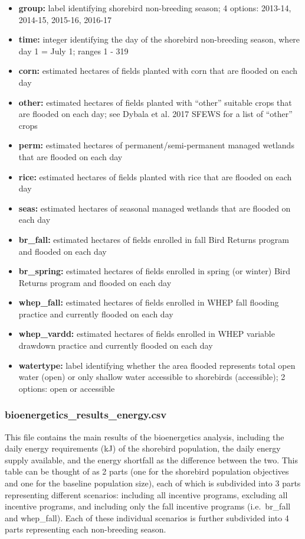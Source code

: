 \documentclass[]{article}
\providecommand{\tightlist}{%
  \setlength{\itemsep}{0pt}\setlength{\parskip}{0pt}}
\begin{document}
\begin{itemize}
\tightlist
\item
  \textbf{group:} label identifying shorebird non-breeding season; 4
  options: 2013-14, 2014-15, 2015-16, 2016-17
\item
  \textbf{time:} integer identifying the day of the shorebird
  non-breeding season, where day 1 = July 1; ranges 1 - 319
\item
  \textbf{corn:} estimated hectares of fields planted with corn that are
  flooded on each day
\item
  \textbf{other:} estimated hectares of fields planted with ``other''
  suitable crops that are flooded on each day; see Dybala et al. 2017
  SFEWS for a list of ``other'' crops
\item
  \textbf{perm:} estimated hectares of permanent/semi-permanent managed
  wetlands that are flooded on each day
\item
  \textbf{rice:} estimated hectares of fields planted with rice that are
  flooded on each day
\item
  \textbf{seas:} estimated hectares of seasonal managed wetlands that
  are flooded on each day
\item
  \textbf{br\_fall:} estimated hectares of fields enrolled in fall Bird
  Returns program and flooded on each day
\item
  \textbf{br\_spring:} estimated hectares of fields enrolled in spring
  (or winter) Bird Returns program and flooded on each day
\item
  \textbf{whep\_fall:} estimated hectares of fields enrolled in WHEP
  fall flooding practice and currently flooded on each day
\item
  \textbf{whep\_vardd:} estimated hectares of fields enrolled in WHEP
  variable drawdown practice and currently flooded on each day
\item
  \textbf{watertype:} label identifying whether the area flooded
  represents total open water (open) or only shallow water accessible to
  shorebirds (accessible); 2 options: open or accessible
\end{itemize}

\subsubsection{bioenergetics\_results\_energy.csv}\label{bioenergetics_results_energy.csv}

This file contains the main results of the bioenergetics analysis,
including the daily energy requirements (kJ) of the shorebird
population, the daily energy supply available, and the energy shortfall
as the difference between the two. This table can be thought of as 2
parts (one for the shorebird population objectives and one for the
baseline population size), each of which is subdivided into 3 parts
representing different scenarios: including all incentive programs,
excluding all incentive programs, and including only the fall incentive
programs (i.e.~br\_fall and whep\_fall). Each of these individual
scenarios is further subdivided into 4 parts representing each
non-breeding season.
\end{document}
